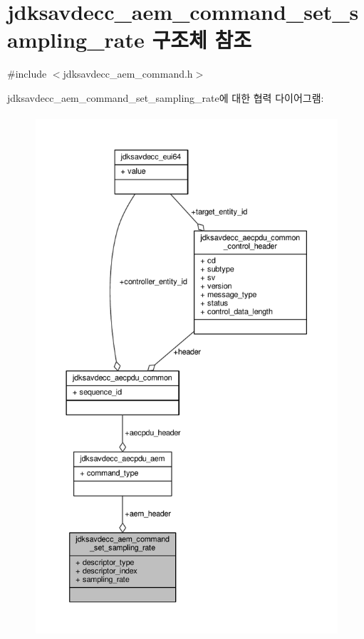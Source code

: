 \hypertarget{structjdksavdecc__aem__command__set__sampling__rate}{}\section{jdksavdecc\+\_\+aem\+\_\+command\+\_\+set\+\_\+sampling\+\_\+rate 구조체 참조}
\label{structjdksavdecc__aem__command__set__sampling__rate}


{\ttfamily \#include $<$jdksavdecc\+\_\+aem\+\_\+command.\+h$>$}



jdksavdecc\+\_\+aem\+\_\+command\+\_\+set\+\_\+sampling\+\_\+rate에 대한 협력 다이어그램\+:
\nopagebreak
\begin{figure}[H]
\begin{center}
\leavevmode
\includegraphics[height=550pt]{structjdksavdecc__aem__command__set__sampling__rate__coll__graph}
\end{center}
\end{figure}
